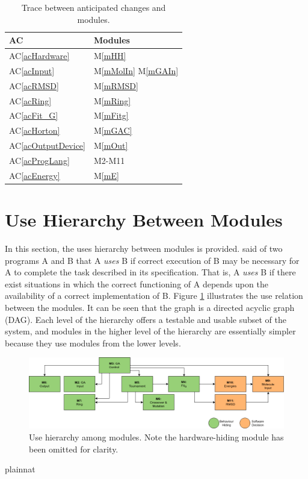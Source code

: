 \documentclass[12pt, titlepage]{article}
\newcommand{\acref}[1]{AC\ref{#1}}
\newcommand{\mref}[1]{M\ref{#1}}
\begin{document}
\begin{table}[H]
\centering
\begin{tabular}{p{} p{}}
\toprule
\textbf{AC} & \textbf{Modules}\\
\midrule
\acref{acHardware} & \mref{mHH}\\
\acref{acInput} & \mref{mMolIn} \mref{mGAIn} \\
\acref{acRMSD} & \mref{mRMSD} \\
\acref{acRing} & \mref{mRing} \\
\acref{acFit_G} & \mref{mFitg} \\
\acref{acHorton} & \mref{mGAC} \\
\acref{acOutputDevice} & \mref{mOut} \\
\acref{acProgLang} & M2-M11 \\
\acref{acEnergy} & \mref{mE} \\
\bottomrule
\end{tabular}
\caption{Trace between anticipated changes and modules.}
\label{trace-ACM}
\end{table}

\section{Use Hierarchy Between Modules} \label{SecUse}

In this section, the uses hierarchy between modules is
provided. \citet{Parnas1978} said of two programs A and B that A {\em uses} B if
correct execution of B may be necessary for A to complete the task described in
its specification. That is, A {\em uses} B if there exist situations in which
the correct functioning of A depends upon the availability of a correct
implementation of B.  Figure \ref{FigUH} illustrates the use relation between
the modules. It can be seen that the graph is a directed acyclic graph
(DAG). Each level of the hierarchy offers a testable and usable subset of the
system, and modules in the higher level of the hierarchy are essentially simpler
because they use modules from the lower levels.

\begin{figure}[H]
\centering
\includegraphics[width=\textwidth]{MG_hierarchy_draft4.png}
\caption{Use hierarchy among modules. Note the hardware-hiding module has been 
omitted for clarity.}
\label{FigUH}
\end{figure}


 {plainnat}

\end{document}
